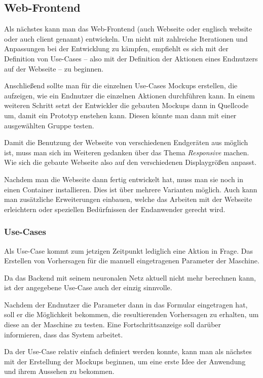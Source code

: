 \subsection{Web-Frontend}
\label{subsec:webseite}
Als nächstes kann man das Web-Frontend (auch Webseite oder englisch website oder auch client genannt) entwickeln. Um
nicht mit zahlreiche Iterationen und Anpassungen bei der Entwicklung zu kämpfen, empfiehlt es sich mit der Definition
von Use-Cases -- also mit der Definition der Aktionen eines Endnutzers auf der Webseite -- zu beginnen.

Anschließend sollte man für die einzelnen Use-Cases Mockups erstellen, die aufzeigen, wie ein Endnutzer die einzelnen
Aktionen durchführen kann. In einem weiteren Schritt setzt der Entwickler die gebauten Mockups dann in Quellcode um,
damit ein Prototyp enstehen kann. Diesen könnte man dann mit einer ausgewählten Gruppe testen.

Damit die Benutzung der Webseite von verschiedenen Endgeräten aus möglich ist, muss man sich im Weiteren gedanken über
das Thema \textit{Responsive} machen. Wie sich die gebaute Webseite also auf den verschiedenen Displaygrößen anpasst.

Nachdem man die Webseite dann fertig entwickelt hat, muss man sie noch in einen Container installieren. Dies ist über
mehrere Varianten möglich. Auch kann man zusätzliche Erweiterungen einbauen, welche das Arbeiten mit der Webseite
erleichtern oder speziellen Bedürfnissen der Endanwender gerecht wird.

\subsubsection{Use-Cases}
Als Use-Case kommt zum jetzigen Zeitpunkt lediglich eine Aktion in Frage. Das Erstellen von Vorhersagen für die
manuell eingetragenen Parameter der Maschine.

Da das Backend mit seinem neuronalen Netz aktuell nicht mehr berechnen kann, ist der angegebene Use-Case auch der einzig
sinnvolle.

Nachdem der Endnutzer die Parameter dann in das Formular eingetragen hat, soll er die Möglichkeit bekommen, die
resultierenden Vorhersagen zu erhalten, um diese an der Maschine zu testen. Eine Fortschrittsanzeige soll darüber
informieren, dass das System arbeitet.

Da der Use-Case relativ einfach definiert werden konnte, kann man als nächstes mit der Erstellung der Mockups beginnen,
um eine erste Idee der Anwendung und ihrem Aussehen zu bekommen.

